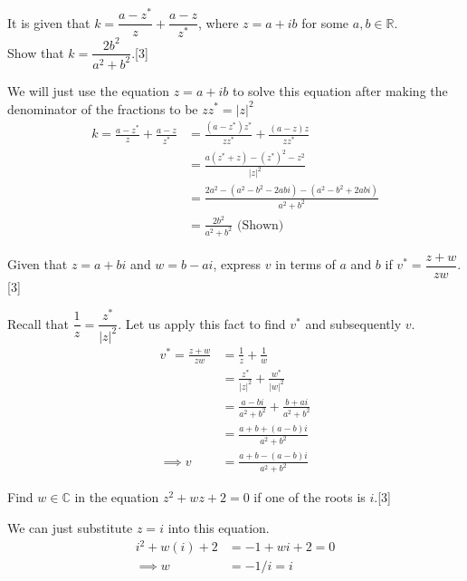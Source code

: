 \documentclass[12pt, a4 paper]{article}
\begin{document}
\begin{outline}[enumerate]
	\2 It is given that $k=\dfrac{a-z^*}{z}+\dfrac{a-z}{z^*}$, where $z=a+ib$ for some $a,b \in \mathbb{R}$.\\Show that $k=\dfrac{2b^2}{a^2+b^2}$.\hfill[3] %
	\begin{answer}
		We will just use the equation $z=a+ib$ to solve this equation after making the denominator of the fractions to be $zz^*=|z|^2$
		\begin{align*}
			k = \frac{a-z^*}{z}+\frac{a-z}{z^*} & = \frac{(a-z^*)z^*}{zz^*} +\frac{(a-z)z}{zz^*}        \\
			                                    & =  \frac{a(z^*+z)-(z^*)^2-z^2}{|z|^2}                 \\
			                                    & =  \frac{2a^2-(a^2-b^2-2abi)-(a^2-b^2+2abi)}{a^2+b^2} \\
			                                    & = \frac{2b^2}{a^2+b^2} \textrm{ (Shown)}
		\end{align*}
	\end{answer}

	\2 Given that $z=a+bi$ and $w=b-ai$, express $v$ in terms of $a$ and $b$ if $v^*=\dfrac{z+w}{zw}$.\hfill[3] %
	\begin{answer}
		Recall that $\dfrac{1}{z} = \dfrac{z^*}{|z|^2}$. Let us apply this fact to find $v^*$ and subsequently $v$.
		\begin{align*}
			v^*=\frac{z+w}{zw} & = \frac{1}{z}+\frac{1}{w}                   \\
			                   & = \frac{z^*}{|z|^2}+\frac{w^*}{|w|^2}       \\
			                   & = \frac{a-bi}{a^2+b^2}+\frac{b+ai}{a^2+b^2} \\
			                   & = \frac{a+b+(a-b)i}{a^2+b^2}                \\
			\implies v         & =\frac{a+b-(a-b)i}{a^2+b^2}
		\end{align*}
	\end{answer}

	\2 Find $w \in \mathbb{C}$ in the equation $z^2+wz+2=0$ if one of the roots is $i$.\hfill[3] %
	\begin{answer}
		We can just substitute $z=i$ into this equation.
		\begin{align*}
			i^2+w(i)+2 & =-1+wi+2=0 \\
			\implies w & =-1/i=i
		\end{align*}
	\end{answer}


\end{outline}
\end{document}
